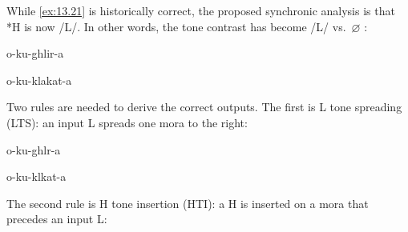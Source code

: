 \documentclass[output=paper]{langsci/langscibook}
\begin{document}
While \eqref{ex:13.21} is historically correct, the proposed synchronic
analysis is that *H is now /L/. In other words, the  tone contrast has
become /L/ vs.\ $\varnothing$ \citep{Hyman2018}:

\begin{exe}\ex\label{ex:13.22}
    \begin{minipage}[t]{.50\textwidth}
        \begin{xlist}
             o-ku-ghlir-a  
        \end{xlist}
    \end{minipage}
    \begin{minipage}[t]{.50\textwidth}
         o-ku-klakat-a  
    \end{minipage}
\end{exe}
Two rules are needed to derive the correct outputs. The first is L tone
spreading (LTS): an input L spreads one mora to the right:

\begin{exe}\ex\label{ex:13.23}
    \begin{minipage}[t]{.50\textwidth}
        \begin{xlist}
             o-ku-ghlr-a  
        \end{xlist}
    \end{minipage}
    \begin{minipage}[t]{.50\textwidth}
         o-ku-klkat-a  
    \end{minipage}
    \vspace{.25\baselineskip}
\end{exe}
The second rule is H tone insertion (\gls{HTI}): a H is inserted
on a mora that precedes an input L:
\end{document}
